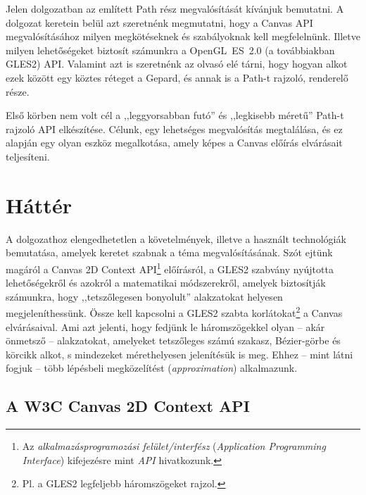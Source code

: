 \documentclass[12pt]{report}
\theoremstyle{definition}
\newcommand{\inenglish}[1]{\textsl{#1}}
\begin{document}
Jelen dolgozatban az említett Path rész megvalósítását kívánjuk bemutatni. A
dolgozat keretein belül azt szeretnénk megmutatni, hogy a Canvas API
megvalósításához milyen megkötéseknek és szabályoknak kell megfelelnünk.
Illetve milyen lehetőségeket biztosít számunkra a OpenGL~ES~2.0 (a továbbiakban
GLES2) API. Valamint azt is szeretnénk az olvasó elé tárni, hogy hogyan alkot
ezek között egy köztes réteget a Gepard, és annak is a Path-t rajzoló,
renderelő része.

Első körben nem volt cél a ,,leggyorsabban futó'' és ,,legkisebb méretű''
Path-t rajzoló API elkészítése. Célunk, egy lehetséges megvalósítás
megtalálása, és ez alapján egy olyan eszköz megalkotása, amely képes a Canvas
előírás elvárásait teljesíteni.



    \chapter{Háttér}
    \label{sec:Háttér}

A dolgozathoz elengedhetetlen a követelmények, illetve a használt technológiák
bemutatása, amelyek keretet szabnak a téma megvalósításának. Szót ejtünk
magáról a Canvas 2D Context API\footnote{Az \emph{alkalmazásprogramozási
felület/interfész} (\inenglish{Application Programming Interface}) kifejezésre
mint \emph{API} hivatkozunk.} előírásról, a GLES2 szabvány nyújtotta
lehetőségekről és azokról a matematikai módszerekről, amelyek biztosítják
számunkra, hogy ,,tetszőlegesen bonyolult'' alakzatokat helyesen
megjeleníthessünk. Össze kell kapcsolni a GLES2 szabta korlátokat\footnote {Pl.
a GLES2 legfeljebb háromszögeket rajzol.} a Canvas elvárásaival. Ami azt
jelenti, hogy fedjünk le háromszögekkel olyan -- akár önmetsző -- alakzatokat,
amelyeket tetszőleges számú szakasz, Bézier-görbe és körcikk alkot, s
mindezeket mérethelyesen jelenítésük is meg. Ehhez -- mint látni fogjuk -- több
lépésbeli megközelítést (\inenglish{approximation}) alkalmazunk.

    \section[A Canvas 2D Context API]{A W3C Canvas 2D Context API}
    \label{sec:A_Canvas_előírás}
\end{document}
